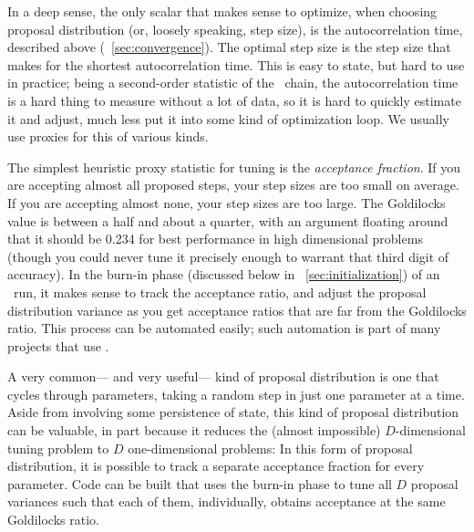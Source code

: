 \documentclass[modern]{aastex61}
\newcommand{\MCMC}{\acronym{MCMC}}
\begin{document}
In a deep sense, the only scalar that makes sense to optimize,
  when choosing proposal distribution (or, loosely speaking, step size),
  is the autocorrelation time, described above (\sectionname~\ref{sec:convergence}).
The optimal step size is the step size that makes for the shortest autocorrelation time.
This is easy to state, but hard to use in practice;
  being a second-order statistic of the \MCMC\ chain,
  the autocorrelation time is a hard thing to measure without a lot of data,
  so it is hard to quickly estimate it and adjust,
  much less put it into some kind of optimization loop.
We usually use proxies for this of various kinds.

The simplest heuristic proxy statistic for tuning is the \emph{acceptance fraction}.
If you are accepting almost all proposed steps, your step sizes are too small on average.
If you are accepting almost none, your step sizes are too large.
The Goldilocks value is between a half and about a quarter,
  with an argument floating around that it should be 0.234 for best
  performance in high dimensional problems
  (though you could never tune it precisely enough to warrant that third digit of accuracy).
In the burn-in phase (discussed below in \sectionname~\ref{sec:initialization}) of an \MCMC\ run,
  it makes sense to track the acceptance ratio,
  and adjust the proposal distribution variance as you get acceptance ratios
  that are far from the Goldilocks ratio.
This process can be automated easily;
  such automation is part of many projects that use \MCMC.

A very common---%
  and very useful---%
  kind of proposal distribution is one that cycles through parameters,
  taking a random step in just one parameter at a time.
Aside from involving some persistence of state,
  this kind of proposal distribution can be valuable,
  in part because it reduces the (almost impossible) $D$-dimensional tuning problem
  to $D$ one-dimensional problems:
In this form of proposal distribution,
  it is possible to track a separate acceptance fraction for every parameter.
Code can be built that uses the burn-in phase to tune all $D$ proposal variances
  such that each of them, individually,
  obtains acceptance at the same Goldilocks ratio.
\end{document}
